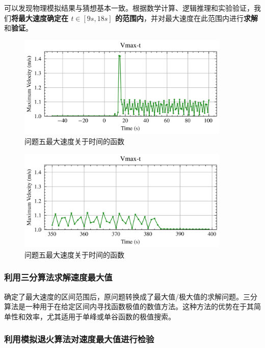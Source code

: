 \documentclass[a4paper]{article}
\begin{document}
		可以发现物理模拟结果与猜想基本一致。根据数学计算、逻辑推理和实验验证，我们\textbf{将最大速度确定在 $t \in [9s,18s]$ 的范围内}，并对最大速度在此范围内进行\textbf{求解}和\textbf{验证}。
		
		\begin{figure}[H]
			\centering
			\includegraphics[width=0.9\textwidth]{image/Figure_5511.png}
			\caption{问题五最大速度关于时间的函数}
			\label{Figure_5511}
		\end{figure}
	
		\begin{figure}[H]
			\centering
			\includegraphics[width=0.9\textwidth]{image/Figure_5512.png}
			\caption{问题五最大速度关于时间的函数}
			\label{Figure_5512}
		\end{figure}
		
	\subsubsection{利用三分算法求解速度最大值}
	
		确定了最大速度的区间范围后，原问题转换成了最大值/极大值的求解问题。三分算法是一种用于在给定区间内寻找函数极值的数值方法。这种方法的优势在于其简单性和效率，尤其适用于单峰或单谷函数的极值搜索。
		
		
		
		
		
	\subsubsection{利用模拟退火算法对速度最大值进行检验}
		
\end{document}
